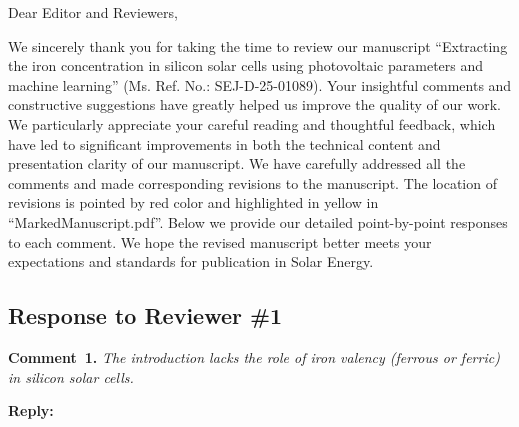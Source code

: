 \documentclass[a4paper,fleqn]{cas-sc}
\begin{document}
\shorttitle{}


Dear Editor and Reviewers,

We sincerely thank you for taking the time to review our manuscript
``Extracting the iron concentration in silicon solar cells using photovoltaic parameters and machine learning''
(Ms. Ref. No.: SEJ-D-25-01089).
Your insightful comments and constructive suggestions have greatly helped us improve
the quality of our work.
We particularly appreciate your careful reading and thoughtful feedback,
which have led to significant improvements in both the technical content and presentation clarity of our manuscript.
We have carefully addressed all the comments and made corresponding revisions to the manuscript.
The location of revisions is pointed by red color and highlighted in yellow in ``MarkedManuscript.pdf''.
Below we provide our detailed point-by-point responses to each comment.
We hope the revised manuscript better meets your expectations and standards for publication in Solar Energy.

\subsection*{Response to Reviewer \#1 }

\noindent
\textcolor[rgb]{0.00,0.50,1.00}{\textbf{Comment~1.}}
\emph{The introduction lacks the role of iron valency (ferrous or ferric) in silicon solar cells.}

\noindent
\textcolor[rgb]{0.51,0.00,0.00}{\textbf{Reply:}}
\end{document}
